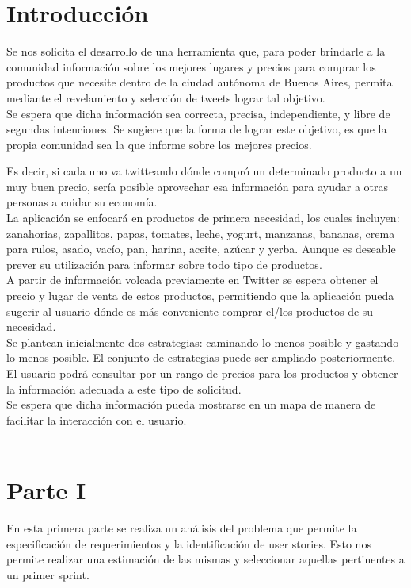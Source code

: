 \section{Introducción}
Se nos solicita el desarrollo de una herramienta que, para poder brindarle a la comunidad información sobre los mejores lugares y precios para comprar los productos que necesite dentro de la ciudad autónoma de Buenos Aires, permita mediante el revelamiento y selección de tweets lograr tal objetivo. \\

Se espera que dicha información sea correcta, precisa, independiente, y libre de segundas intenciones. Se sugiere que la forma de lograr este objetivo, es que la propia comunidad sea la que informe sobre los mejores precios.

Es decir, si cada uno va twitteando dónde compró un determinado producto a un muy
buen precio, sería posible aprovechar esa información para ayudar a otras personas a cuidar su economía.\\

La aplicación se enfocará en productos de primera necesidad, los cuales incluyen: zanahorias, zapallitos, papas, tomates, leche, yogurt,
manzanas, bananas, crema para rulos, asado, vacío, pan, harina, aceite, azúcar y yerba. Aunque es deseable prever su utilización para informar sobre todo tipo de productos. \\

A partir de información volcada previamente en Twitter se espera obtener el precio y lugar de venta de estos productos, permitiendo que la aplicación pueda sugerir al usuario dónde es más conveniente comprar el/los productos de su necesidad.\\

Se plantean inicialmente dos estrategias: caminando lo menos posible y gastando lo menos posible. El conjunto de estrategias puede ser ampliado posteriormente.\\
El usuario podrá consultar por un rango de precios para los productos y obtener la información adecuada a este tipo de solicitud. \\

Se espera que dicha información pueda mostrarse en un mapa de manera de facilitar la interacción con el usuario.\\\\

\section{Parte I}
En esta primera parte se realiza un análisis del problema que permite la especificación de requerimientos y la identificación de user stories. Esto nos permite realizar una estimación de las mismas y seleccionar aquellas pertinentes a un primer sprint.\\


